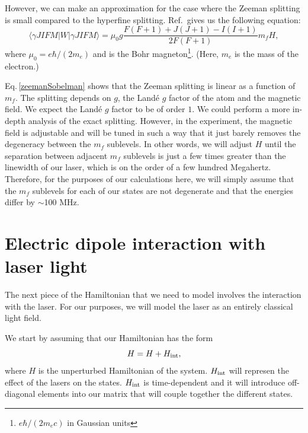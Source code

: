 However, we can make an approximation for the case where the Zeeman splitting is small compared to the hyperfine splitting. 
Ref.\,\cite{sobelman_spectra} gives us the following equation:
\begin{equation} \label{zeemanSobelman}
\langle{\gamma JIFM|W|\gamma JIFM\rangle = \mu_0 g \frac{F(F+1)+J(J+1)-I(I+1)}{2F(F+1)}m_f H},
\end{equation}
where $\mu_0=e\hbar/(2 m_e)$ and is the Bohr magneton\footnote{$e \hbar / (2 m_e c)$ in Gaussian units}. (Here, $m_e$ is the mass of the electron.)

Eq.\,\ref{zeemanSobelman} shows that the Zeeman splitting is linear as a function of $m_f$. The splitting depends on $g$, the Land\'e $g$ factor of the atom and the magnetic field. We expect the Land\'e $g$ factor to be of order $1$. We could perform a more in-depth analysis of the exact splitting. However, in the experiment, the magnetic field is adjustable and will be tuned in such a way that it just barely removes the degeneracy between the $m_f$ sublevels. In other words, we will adjust $H$ until the separation between adjacent $m_f$ sublevels is just a few times greater than the linewidth of our laser, which is on the order of a few hundred Megahertz. Therefore, for the purposes of our calculations here, we will simply assume that the $m_f$ sublevels for each of our states are not degenerate and that the energies differ by $\sim$100 MHz.

\section{Electric dipole interaction with laser light}
\label{ElectricDipoleInteraction}

The next piece of the Hamiltonian that we need to model involves the interaction with the laser. For our purposes, we will model the laser as an entirely classical light field.  

We start by assuming that our Hamiltonian has the form 
\begin{equation}
H=H+H_{\textnormal{int}},
\end{equation}
where $H$ is the unperturbed Hamiltonian of the system. $H_{\textnormal{int}}$ will represen the effect of the lasers on the states. $H_\textnormal{int}$ is time-dependent and it will introduce off-diagonal elements into our matrix that will couple together the different states. 

